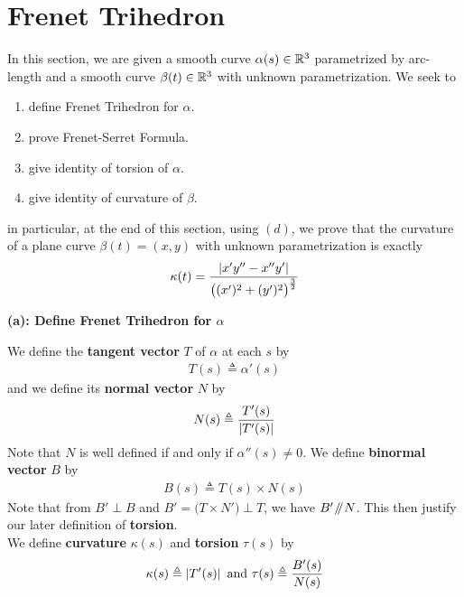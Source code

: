 \documentclass{report}
\begin{document}
\section{Frenet Trihedron}
\begin{mdframed}
In this section, we are given a smooth curve $\alpha (s)\in\mathbb{R}^3$ parametrized by arc-length and a smooth curve $\beta  (t)\in\mathbb{R}^3$ with unknown parametrization. We seek to 
\begin{enumerate}[label=(\alph*)]
  \item define Frenet Trihedron for $\alpha $.
  \item prove Frenet-Serret Formula.
  \item give identity of torsion of $\alpha $.
  \item give identity of curvature of $\beta $.
\end{enumerate}
in particular, at the end of this section, using $(d)$, we prove that the curvature of a plane curve $\beta (t)=(x,y)$ with unknown parametrization is exactly 
\begin{align*}
\kappa(t)=\frac{\left|x'y''-x''y'\right|}{\big((x')^{2}+(y')^{2} \big)^{\frac{3}{2}}}
\end{align*}
\end{mdframed}
\textbf{(a): Define Frenet Trihedron for $\alpha $}
\begin{mdframed}
We define the \textbf{tangent vector} $T$ of $\alpha $ at each $s$ by 
 \begin{align*}
T(s)\triangleq \alpha '(s)
\end{align*}
and we define its \textbf{normal vector} $N$ by
\begin{align*}
N(s)\triangleq \frac{T'(s)}{\left|T'(s)\right|}
\end{align*}
Note that $N$ is well defined if and only if  $\alpha ''(s)\neq 0$. We define  \textbf{binormal vector} $B$ by 
 \begin{align*}
B(s)\triangleq T(s)\times N(s)
\end{align*}
Note that from $B'\perp B$ and $B'=\big( T \times N'\big) \perp T$, we have $B'\mathbin{\!/\mkern-5mu/\!}  N$. This then justify our later definition of  \textbf{torsion}.\\

We define \textbf{curvature} $\kappa (s)$ and \textbf{torsion} $\tau(s)$ by 
\begin{align*}
\kappa(s)\triangleq \left|T'(s)\right|\text{ and }\tau(s)\triangleq \frac{B'(s)}{N(s)}
\end{align*}
\end{mdframed}
\end{document}
